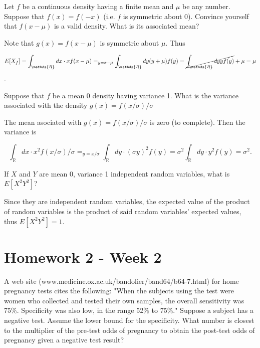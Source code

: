 \documentclass{homework}
\begin{document}
\begin{tcolorbox}[title=Question 18]
Let $f$ be a continuous density having a finite mean and $\mu$ be any number. Suppose that $f(x)= f(-x)$ (i.e. $f$ is symmetric about 0). Convince yourself that $f(x-\mu)$ is a valid density. What is its associated mean?
\end{tcolorbox}

Note that $g(x)=f(x-\mu)$ is symmetric about $\mu$. Thus

$$
E[X_f] = \int_{\mathds{R}} dx \cdot x f(x-\mu) =_{y= x-\mu}\int_{\mathds{R}} dy (y+\mu) f(y) = \cancel{\int_{\mathds{R}} dy y f(y)} + \mu = \mu
$$.

\begin{tcolorbox}[title=Question 19]
Suppose that $f$ be a mean 0 density having variance 1. What is the variance associated with the density $g(x) = f( x  / \sigma) / \sigma$
\end{tcolorbox}

The mean asociated with $g(x) = f(x/\sigma)/\sigma$ is zero (to complete). Then the variance is 

$$
\int_{\mathds{R}} dx \cdot x^2f( x  / \sigma) / \sigma =_{y = x/\sigma} \int_{\mathds{R}} dy \cdot (\sigma y)^2f( y) = \sigma^2 \int_{\mathds{R}} dy \cdot y^2 f(y) = \sigma^2.
$$

\begin{tcolorbox}[title=Question 20]
If $X$ and $Y$ are mean 0, variance 1 independent random variables, what is $E[X^2Y^2]$?
\end{tcolorbox}
Since they are independent random variables, the expected value of the product of random variables is the product of said random variables' expected values, thus $E[X^2Y^2]=1$.

\clearpage
\section{Homework 2 - Week 2}

\begin{tcolorbox}[title=Question 1]
A web site (www.medicine.ox.ac.uk/bandolier/band64/b64-7.html) for home pregnancy tests cites the following: "When the subjects using the test were women who collected and tested their own samples, the overall sensitivity was 75\%. Specificity was also low, in the range 52\% to 75\%." Suppose a subject has a negative test. Assume the lower bound for the specificity. What number is closest to the multiplier of the pre-test odds of pregnancy to obtain the post-test odds of pregnancy given a negative test result?
\end{tcolorbox}
\end{document}

